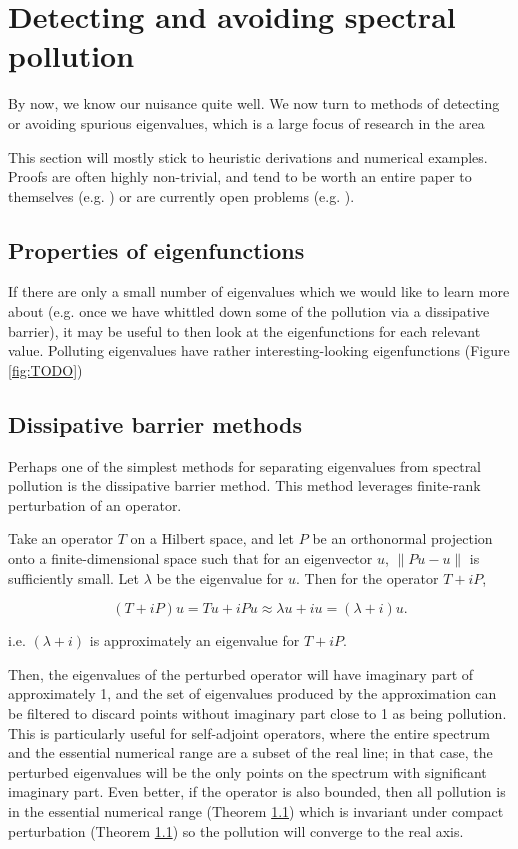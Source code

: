 \documentclass[../main.tex]{subfiles}
\begin{document}
\section{Detecting and avoiding spectral pollution}
By now, we know our nuisance quite well. We now turn to methods of detecting or avoiding spurious eigenvalues, which is a large focus of research in the area 

This section will mostly stick to heuristic derivations and numerical examples. Proofs are often highly non-trivial, and tend to be worth an entire paper to themselves (e.g. \cite{soussi2006convergence}) or are currently open problems (e.g. \cite{chandler-wilde2012spectrum}).

\subsection{Properties of eigenfunctions}
If there are only a small number of eigenvalues which we would like to learn more about (e.g. once we have whittled down some of the pollution via a dissipative barrier), it may be useful to then look at the eigenfunctions for each relevant value. Polluting eigenvalues have rather interesting-looking eigenfunctions (Figure \ref{fig:TODO})

\subsection{Dissipative barrier methods}\label{sec:dissipative-barrier}
Perhaps one of the simplest methods for separating eigenvalues from spectral pollution is the dissipative barrier method.
This method leverages finite-rank perturbation of an operator.

Take an operator $T$ on a Hilbert space, and
let $P$ be an orthonormal projection onto a finite-dimensional space  such that for an eigenvector $u$, $\|Pu - u\|$ is sufficiently small.
Let $\lambda$ be the eigenvalue for $u$. Then for the operator $T+iP$,

$$(T+iP) u = Tu + iPu \approx \lambda u + iu = (\lambda + i)u.$$

i.e. $(\lambda + i)$ is approximately an eigenvalue for $T+iP$. 

Then, the eigenvalues of the perturbed operator will have imaginary part of approximately 1, and the set of eigenvalues produced by the approximation 
can be filtered to discard points without imaginary part close to 1 as being pollution. This is particularly useful for self-adjoint operators, where the entire spectrum and the essential numerical range are a subset of the real line; in that case, the perturbed eigenvalues will be the only points on the spectrum with significant imaginary part. Even better, if the operator is also bounded, then all pollution is in the essential numerical range (Theorem \ref{}) which is
invariant under compact perturbation (Theorem \ref{}) so the pollution will converge to the real axis.
\end{document}
